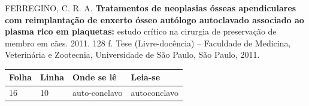 \begin{errata}
\noindent FERREGINO, C. R. A. \textbf{Tratamentos de neoplasias ósseas apendiculares com reimplantação de enxerto ósseo autólogo autoclavado associado ao plasma rico em plaquetas:} estudo crítico na cirurgia de preservação de membro em cães. 2011. 128 f. Tese (Livre-docência) – Faculdade de Medicina, Veterinária e Zootecnia, Universidade de São Paulo, São Paulo, 2011.
\begin{table}[htb]
\center
\footnotesize
\begin{tabular}{|p{3cm}|p{3cm}|p{3cm}|p{3cm}|}
\hline
\textbf{Folha} & \textbf{Linha} & \textbf{Onde se lê} &
\textbf{Leia-se}\\
\hline
16 & 10 & auto-conclavo & autoconclavo\\
\hline
\end{tabular}
\end{table}
\end{errata}
